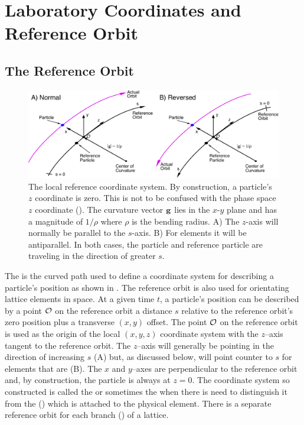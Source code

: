 \section{Laboratory Coordinates and Reference Orbit}
\label{s:local.coords}

\subsection{The Reference Orbit}
\label{s:ref}

\begin{figure}[tb]
  \centering
  \includegraphics[width=6in]{local-coords.pdf}
  \caption[The local Reference System.]
{The local reference coordinate system. By construction, a particle's $z$ coordinate is zero.  This
is not to be confused with the phase space $z$ coordinate (). The curvature
vector ${\bf g}$ lies in the $x$-$y$ plane and has a magnitude of $1/\rho$ where $\rho$ is the bending
radius. A) The $z$-axis will normally be parallel to the $s$-axis. B) For  elements it
will be antiparallel. In both cases, the particle and reference particle are traveling in the
direction of greater $s$.}
  \label{f:local.coords}
\end{figure}

The  is the curved path used to define a coordinate system for describing
a particle's position as shown in . The reference orbit is also used for
orientating lattice elements in space. At a given time $t$, a particle's position can be described
by a point ${\cal O}$ on the reference orbit a distance $s$ relative to the reference orbit's zero
position plus a transverse $(x,y)$ offset. The point ${\cal O}$ on the reference orbit is used as the
origin of the local $(x, y, z)$ coordinate system with the $z$--axis tangent to the reference
orbit. The $z$--axis will generally be pointing in the direction of increasing $s$
(A) but, as discussed below, will point counter to $s$ for elements that are
 (B). The $x$ and $y$--axes are perpendicular to the reference
orbit and, by construction, the particle is always at $z = 0$. The coordinate system so constructed
is called the  or sometimes the  when there is need to distinguish it from the 
() which is attached to the physical element. There is a separate reference orbit
for each branch () of a lattice.

